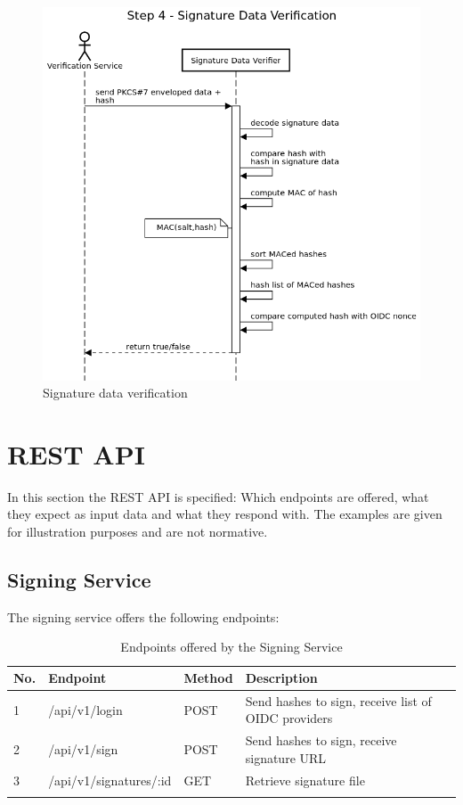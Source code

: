 \begin{figure}
	\begin{center}
		\includegraphics[scale=0.5]{images/protocol_verification_step4_signature_data.png}
		\caption{Signature data verification}
		\label{fig:signaturedataverification}
	\end{center}
\end{figure}

\section{REST API}\label{sec:rest-api}
In this section the \gls{REST} \gls{API} is specified:
Which endpoints are offered, what they expect as input data and what they respond with.
The examples are given for illustration purposes and are not normative.

\subsection{Signing Service}
The signing service offers the following endpoints:

\begin{longtable}{|l|l|l|l|}
	\hline
	\textbf{No.} & \textbf{Endpoint} & \textbf{Method} & \textbf{Description} \\ \hline
	1 & /api/v1/login & POST & Send hashes to sign, receive list of OIDC providers \\ \hline
	2 & /api/v1/sign & POST & Send hashes to sign, receive signature URL \\ \hline
	3 & /api/v1/signatures/:id & GET & Retrieve signature file \\ \hline
\caption{Endpoints offered by the Signing Service}
\end{longtable}

